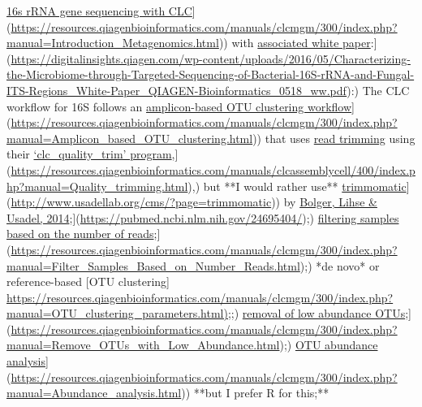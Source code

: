 \documentclass[
]{book}
\begin{document}
\href{\%5Bhttps://resources.qiagenbioinformatics.com/manuals/clcmgm/300/index.php?manual=Introduction_Metagenomics.html}{16s rRNA gene sequencing with CLC}{]}(\url{https://resources.qiagenbioinformatics.com/manuals/clcmgm/300/index.php?manual=Introduction_Metagenomics.html})) with \href{\%5Bhttps://digitalinsights.qiagen.com/wp-content/uploads/2016/05/Characterizing-the-Microbiome-through-Targeted-Sequencing-of-Bacterial-16S-rRNA-and-Fungal-ITS-Regions_White-Paper_QIAGEN-Bioinformatics_0518_ww.pdf}{associated white paper}:{]}(\url{https://digitalinsights.qiagen.com/wp-content/uploads/2016/05/Characterizing-the-Microbiome-through-Targeted-Sequencing-of-Bacterial-16S-rRNA-and-Fungal-ITS-Regions_White-Paper_QIAGEN-Bioinformatics_0518_ww.pdf}):) The CLC workflow for 16S follows an \href{\%5Bhttps://resources.qiagenbioinformatics.com/manuals/clcmgm/300/index.php?manual=Amplicon_based_OTU_clustering.html}{amplicon-based OTU clustering workflow}{]}(\url{https://resources.qiagenbioinformatics.com/manuals/clcmgm/300/index.php?manual=Amplicon_based_OTU_clustering.html})) that uses \href{}{read trimming} using their \href{\%5Bhttps://resources.qiagenbioinformatics.com/manuals/clcassemblycell/400/index.php?manual=Quality_trimming.html}{`clc\_quality\_trim' program},{]}(\url{https://resources.qiagenbioinformatics.com/manuals/clcassemblycell/400/index.php?manual=Quality_trimming.html}),) but **I would rather use** \href{\%5Bhttp://www.usadellab.org/cms/?page=trimmomatic}{trimmomatic}{]}(\url{http://www.usadellab.org/cms/?page=trimmomatic})) by \href{\%5Bhttps://pubmed.ncbi.nlm.nih.gov/24695404/}{Bolger, Lihse \& Usadel, 2014};{]}(\url{https://pubmed.ncbi.nlm.nih.gov/24695404/});) \href{\%5Bhttps://resources.qiagenbioinformatics.com/manuals/clcmgm/300/index.php?manual=Filter_Samples_Based_on_Number_Reads.html}{filtering samples based on the number of reads};{]}(\url{https://resources.qiagenbioinformatics.com/manuals/clcmgm/300/index.php?manual=Filter_Samples_Based_on_Number_Reads.html});) *de novo* or reference-based {[}OTU clustering{]} \href{https://resources.qiagenbioinformatics.com/manuals/clcmgm/300/index.php?manual=OTU_clustering_parameters.html}{https://resources.qiagenbioinformatics.com/manuals/clcmgm/300/index.php?manual=OTU\_clustering\_parameters.html);};) \href{\%5Bhttps://resources.qiagenbioinformatics.com/manuals/clcmgm/300/index.php?manual=Remove_OTUs_with_Low_Abundance.html}{removal of low abundance OTUs};{]}(\url{https://resources.qiagenbioinformatics.com/manuals/clcmgm/300/index.php?manual=Remove_OTUs_with_Low_Abundance.html});) \href{\%5Bhttps://resources.qiagenbioinformatics.com/manuals/clcmgm/300/index.php?manual=Abundance_analysis.html}{OTU abundance analysis}{]}(\url{https://resources.qiagenbioinformatics.com/manuals/clcmgm/300/index.php?manual=Abundance_analysis.html})) **but I prefer R for this;**
\end{document}
